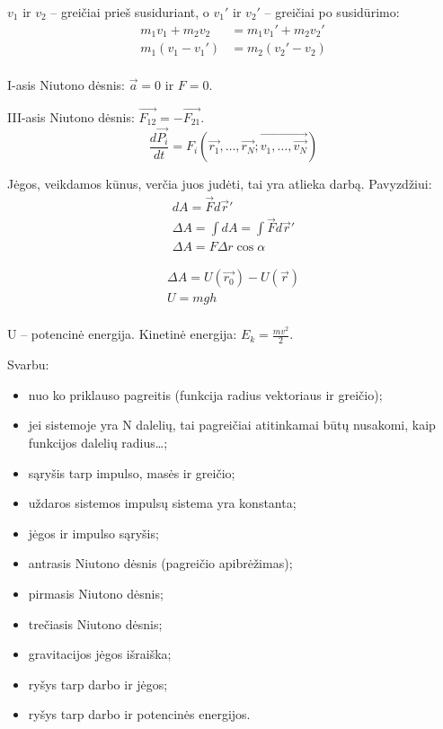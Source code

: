 $v_{1}$ ir $v_{2}$ – greičiai prieš susiduriant, o
$v_{1}'$ ir $v_{2}'$ – greičiai po susidūrimo:
\begin{align*}
  m_{1}v_{1} + m_{2}v_{2} &= m_{1}v_{1}' + m_{2}v_{2}' \\
  m_{1}(v_{1}-v_{1}') &= m_{2}(v_{2}' - v_{2}) \\
\end{align*}

I-asis Niutono dėsnis: $\vec{a} = 0$ ir $F = 0$.

III-asis Niutono dėsnis: $\vec{F_{12}} = - \vec{F_{21}}$.
\begin{equation*}
  \frac{d\vec{P_{i}}}{dt}
  = F_{i} (\vec{r_{1}},\ldots,\vec{r_{N}}; \vec{v_{1},\ldots,\vec{v_{N}}})
\end{equation*}

Jėgos, veikdamos kūnus, verčia juos judėti, tai yra atlieka darbą.
Pavyzdžiui:
\begin{align*}
  dA = \vec{F}d\vec{r}'\\
  \Delta A = \int dA = \int \vec{F}d\vec{r}' \\
  \Delta A= F \Delta r \cos \alpha
\end{align*}


\begin{align*}
  \Delta A = U(\vec{r_{0}}) - U(\vec{r}) \\
  U = mgh \\
\end{align*}

U – potencinė energija. Kinetinė energija: $E_{k} = \frac{mv^{2}}{2}$.

Svarbu:
\begin{itemize}
  \item nuo ko priklauso pagreitis (funkcija radius vektoriaus ir greičio);
  \item jei sistemoje yra N dalelių, tai pagreičiai atitinkamai būtų
    nusakomi, kaip funkcijos dalelių radius…;
  \item sąryšis tarp impulso, masės ir greičio;
  \item uždaros sistemos impulsų sistema yra konstanta;
  \item jėgos ir impulso sąryšis;
  \item antrasis Niutono dėsnis (pagreičio apibrėžimas);
  \item pirmasis Niutono dėsnis;
  \item trečiasis Niutono dėsnis;
  \item gravitacijos jėgos išraiška;
  \item ryšys tarp darbo ir jėgos;
  \item ryšys tarp darbo ir potencinės energijos.
\end{itemize}

